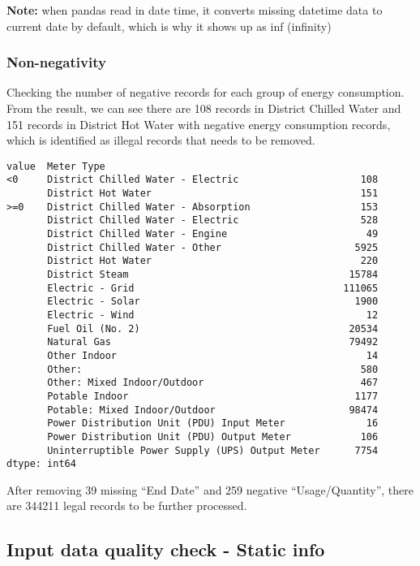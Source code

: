\documentclass[12pt]{article}
\newcommand{\note}[0]{\textbf{Note: }}
\begin{document}
\note when pandas read in date time, it converts missing datetime data
to current date by default, which is why it shows up as inf (infinity)

\subsubsection{Non-negativity}
Checking the number of negative records for each group of energy
consumption. From the result, we can see there are 108 records in
District Chilled Water and 151 records in District Hot Water with
negative energy consumption records, which is identified as illegal
records that needs to be removed.

\begin{verbatim}
value  Meter Type                                     
<0     District Chilled Water - Electric                     108
       District Hot Water                                    151
>=0    District Chilled Water - Absorption                   153
       District Chilled Water - Electric                     528
       District Chilled Water - Engine                        49
       District Chilled Water - Other                       5925
       District Hot Water                                    220
       District Steam                                      15784
       Electric - Grid                                    111065
       Electric - Solar                                     1900
       Electric - Wind                                        12
       Fuel Oil (No. 2)                                    20534
       Natural Gas                                         79492
       Other Indoor                                           14
       Other:                                                580
       Other: Mixed Indoor/Outdoor                           467
       Potable Indoor                                       1177
       Potable: Mixed Indoor/Outdoor                       98474
       Power Distribution Unit (PDU) Input Meter              16
       Power Distribution Unit (PDU) Output Meter            106
       Uninterruptible Power Supply (UPS) Output Meter      7754
dtype: int64
\end{verbatim}

After removing 39 missing ``End Date'' and 259 negative
``Usage/Quantity'', there are 344211 legal records to be further
processed.

\subsection{Input data quality check - Static info}
\end{document}
